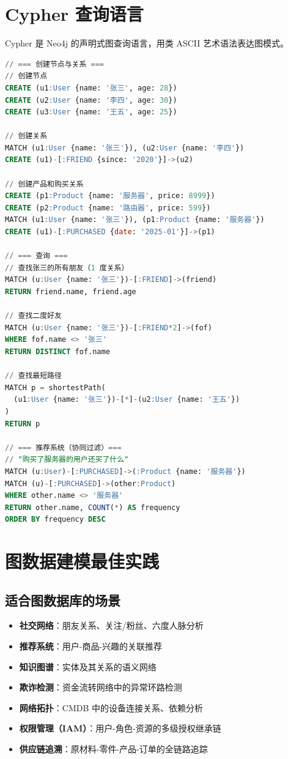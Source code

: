\documentclass[12pt,UTF8]{ctexbook}
\begin{document}
\section{Cypher 查询语言}
\label{sec:cypher}

Cypher 是 Neo4j 的声明式图查询语言，用类 ASCII 艺术语法表达图模式。

\begin{lstlisting}[language=sql]
// === 创建节点与关系 ===
// 创建节点
CREATE (u1:User {name: '张三', age: 28})
CREATE (u2:User {name: '李四', age: 30})
CREATE (u3:User {name: '王五', age: 25})

// 创建关系
MATCH (u1:User {name: '张三'}), (u2:User {name: '李四'})
CREATE (u1)-[:FRIEND {since: '2020'}]->(u2)

// 创建产品和购买关系
CREATE (p1:Product {name: '服务器', price: 8999})
CREATE (p2:Product {name: '路由器', price: 599})
MATCH (u1:User {name: '张三'}), (p1:Product {name: '服务器'})
CREATE (u1)-[:PURCHASED {date: '2025-01'}]->(p1)

// === 查询 ===
// 查找张三的所有朋友（1 度关系）
MATCH (u:User {name: '张三'})-[:FRIEND]->(friend)
RETURN friend.name, friend.age

// 查找二度好友
MATCH (u:User {name: '张三'})-[:FRIEND*2]->(fof)
WHERE fof.name <> '张三'
RETURN DISTINCT fof.name

// 查找最短路径
MATCH p = shortestPath(
  (u1:User {name: '张三'})-[*]-(u2:User {name: '王五'})
)
RETURN p

// === 推荐系统（协同过滤）===
// "购买了服务器的用户还买了什么"
MATCH (u:User)-[:PURCHASED]->(:Product {name: '服务器'})
MATCH (u)-[:PURCHASED]->(other:Product)
WHERE other.name <> '服务器'
RETURN other.name, COUNT(*) AS frequency
ORDER BY frequency DESC
\end{lstlisting}

\section{图数据建模最佳实践}
\label{sec:neo4j-modeling}

\subsection*{适合图数据库的场景}

\begin{itemize}
    \item \textbf{社交网络}：朋友关系、关注/粉丝、六度人脉分析
    \item \textbf{推荐系统}：用户-商品-兴趣的关联推荐
    \item \textbf{知识图谱}：实体及其关系的语义网络
    \item \textbf{欺诈检测}：资金流转网络中的异常环路检测
    \item \textbf{网络拓扑}：CMDB 中的设备连接关系、依赖分析
    \item \textbf{权限管理（IAM）}：用户-角色-资源的多级授权继承链
    \item \textbf{供应链追溯}：原材料-零件-产品-订单的全链路追踪
\end{itemize}
\end{document}
